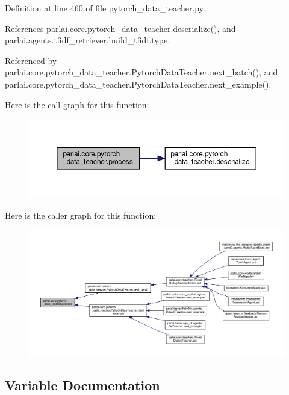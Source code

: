 Definition at line 460 of file pytorch\+\_\+data\+\_\+teacher.\+py.



References parlai.\+core.\+pytorch\+\_\+data\+\_\+teacher.\+deserialize(), and parlai.\+agents.\+tfidf\+\_\+retriever.\+build\+\_\+tfidf.\+type.



Referenced by parlai.\+core.\+pytorch\+\_\+data\+\_\+teacher.\+Pytorch\+Data\+Teacher.\+next\+\_\+batch(), and parlai.\+core.\+pytorch\+\_\+data\+\_\+teacher.\+Pytorch\+Data\+Teacher.\+next\+\_\+example().

Here is the call graph for this function\+:
\nopagebreak
\begin{figure}[H]
\begin{center}
\leavevmode
\includegraphics[width=350pt]{namespaceparlai_1_1core_1_1pytorch__data__teacher_a7b71207eb86027bc93809c1e4d57f641_cgraph}
\end{center}
\end{figure}
Here is the caller graph for this function\+:
\nopagebreak
\begin{figure}[H]
\begin{center}
\leavevmode
\includegraphics[width=350pt]{namespaceparlai_1_1core_1_1pytorch__data__teacher_a7b71207eb86027bc93809c1e4d57f641_icgraph}
\end{center}
\end{figure}


\subsection{Variable Documentation}
\mbox{\label{namespaceparlai_1_1core_1_1pytorch__data__teacher_a34008e5ea53ba69d5da10b59d55abef4}} 
